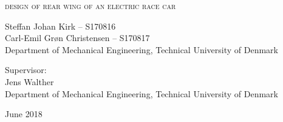 \begin{titlingpage}

\begin{center}

\vspace*{0cm}
\HUGE
\textsc{design of rear wing of an electric race car}\\
\vspace{1.5cm}

%
\vspace{1.2cm}

\large
{
  Steffan Johan Kirk -- S170816\\
    Carl-Emil Grøn Christensen -- S170817\\
    Department of Mechanical Engineering, Technical University of Denmark
}
\vspace{1.5cm}

{
  Supervisor:\\
  Jens Walther\\
  Department of Mechanical Engineering, Technical University of Denmark
}

\vspace{1.5cm}
{June 2018}\\


\end{center}



\end{titlingpage}

